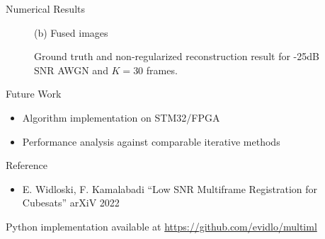 \documentclass[final]{beamer}
\newlength{\sepwidth}
\newlength{\colwidth}
\newcommand{\separatorcolumn}{\begin{column}{\sepwidth}\end{column}}
\begin{document}
\begin{frame}[t]
\begin{columns}[t]
\begin{column}{\colwidth}
\begin{block}{Numerical Results}
\begin{figure}[htb]
\begin{minipage}[b]{0.45\linewidth}
        \centerline{(b) Fused images}\medskip
      \end{minipage}
      \caption{Ground truth and non-regularized reconstruction result for -25dB SNR AWGN and $K=30$ frames.}
      \label{fig:recon}
    \end{figure}

  \end{block}

  \vspace*{-2cm}
  \begin{block}{Future Work}
  \vspace*{-1cm}

    \begin{itemize}
      \item Algorithm implementation on STM32/FPGA
      \item Performance analysis against comparable iterative methods
    \end{itemize}

  \end{block}

  \vspace*{-1cm}
  \begin{block}{Reference}
  \vspace*{-1cm}
    \begin{itemize}
    \item E. Widloski, F. Kamalabadi ``Low SNR Multiframe Registration for Cubesats'' arXiV 2022
    \end{itemize}
  \end{block}

  Python implementation available at \href{https://github.com/evidlo/multiml}{https://github.com/evidlo/multiml}

\end{column}

\separatorcolumn
\end{columns}
\end{frame}
\end{document}
